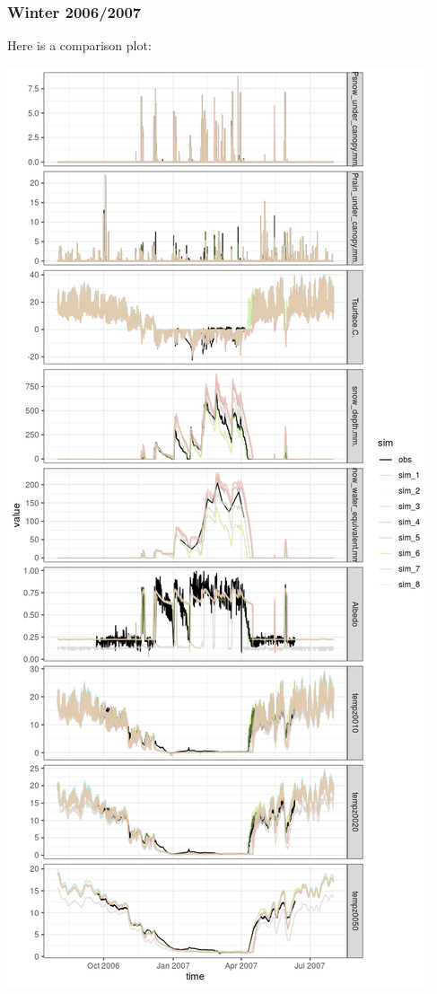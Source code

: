 \documentclass[
]{article}
\begin{document}
\hypertarget{winter-20062007}{%
\subsubsection{Winter 2006/2007}\label{winter-20062007}}

Here is a comparison plot:

\includegraphics{coldelaporte_v6_files/figure-latex/Winter_2006_2007-1.png}
\end{document}
